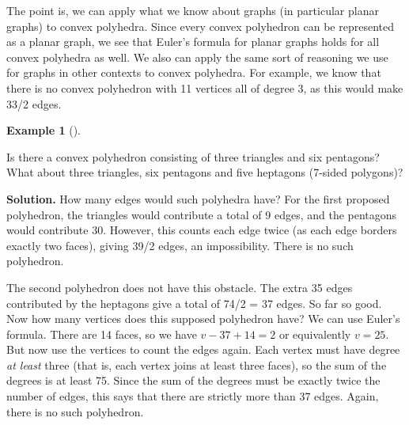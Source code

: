 \documentclass[10pt,]{book}
\theoremstyle{plain}
\theoremstyle{definition}
\newtheorem{example}[theorem]{Example}
\theoremstyle{definition}
\theoremstyle{definition}
\numberwithin{equation}{chapter}
\begin{document}
The point is, we can apply what we know about graphs (in particular planar graphs) to convex polyhedra. Since every convex polyhedron can be represented as a planar graph, we see that Euler's formula for planar graphs holds for all convex polyhedra as well. We also can apply the same sort of reasoning we use for graphs in other contexts to convex polyhedra. For example, we know that there is no convex polyhedron with 11 vertices all of degree 3, as this would make 33/2 edges.
%
\begin{example}[]\label{example-104}

Is there a convex polyhedron consisting of three triangles and six pentagons? What about three triangles, six pentagons and five heptagons (7-sided polygons)?
%
\par\medskip\noindent%
\textbf{Solution.}\quad
How many edges would such polyhedra have? For the first proposed polyhedron, the triangles would contribute a total of 9 edges, and the pentagons would contribute 30. However, this counts each edge twice (as each edge borders exactly two faces), giving 39/2 edges, an impossibility. There is no such polyhedron.
%
\par

The second polyhedron does not have this obstacle. The extra 35 edges contributed by the heptagons give a total of 74/2 = 37 edges. So far so good. Now how many vertices does this supposed polyhedron have? We can use Euler's formula. There are 14 faces, so we have \(v - 37 + 14 = 2\) or equivalently \(v = 25\). But now use the vertices to count the edges again. Each vertex must have degree \emph{at least} three (that is, each vertex joins at least three faces), so the sum of the degrees is at least 75. Since the sum of the degrees must be exactly twice the number of edges, this says that there are strictly more than 37 edges. Again, there is no such polyhedron.
%
\end{example}
\par
\end{document}
